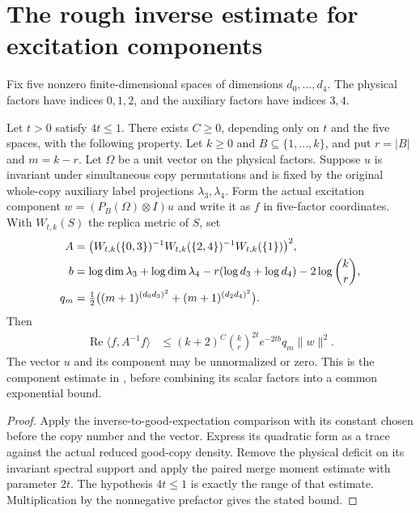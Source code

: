 \section{The rough inverse estimate for excitation components}

Fix five nonzero finite-dimensional spaces of dimensions
$d_0,\ldots,d_4$. The physical factors have indices $0,1,2$, and
the auxiliary factors have indices $3,4$.

\begin{theorem}
  \label{thm:actual_component_inverse_rough}
  \leanok
  Let $t>0$ satisfy $4t\leq1$. There exists $C\geq0$, depending only
  on $t$ and the five spaces, with the following property.
  Let $k\geq0$ and $B\subseteq\{1,\ldots,k\}$, and put $r=|B|$ and
  $m=k-r$. Let $\Omega$ be a unit vector on the physical factors.
  Suppose $u$ is invariant under simultaneous copy permutations and
  is fixed by the original whole-copy auxiliary label projections
  $\lambda_3,\lambda_4$. Form the actual excitation component
  $w=(P_B(\Omega)\otimes I)u$ and write it as $f$ in five-factor
  coordinates. With $W_{t,k}(S)$ the replica metric of $S$, set
  \begin{align}
    A&=\bigl(W_{t,k}(\{0,3\})^{-1}
      W_{t,k}(\{2,4\})^{-1}W_{t,k}(\{1\})\bigr)^2,\notag\\
    b&=\log\dim\lambda_3+\log\dim\lambda_4
      -r(\log d_3+\log d_4)-2\log\binom{k}{r},\notag\\
    q_m&=\tfrac12\bigl((m+1)^{(d_0d_3)^2}
      +(m+1)^{(d_2d_4)^2}\bigr).
  \end{align}
  Then
  \begin{align}
    \operatorname{Re}\langle f,A^{-1}f\rangle
      &\leq (k+2)^C\binom{k}{r}^{2t}e^{-2tb}q_m\|w\|^2.
  \end{align}
  The vector $u$ and its component may be unnormalized or zero.
  This is the component estimate in
  \cite[Section~8]{OpenAI2026AreaLaw}, before combining its scalar
  factors into a common exponential bound.
\end{theorem}
\begin{proof}\leanok
  Apply the inverse-to-good-expectation comparison with its constant
  chosen before the copy number and the vector. Express its quadratic
  form as a trace against the actual reduced good-copy density.
  Remove the physical deficit on its invariant spectral support and
  apply the paired merge moment estimate with parameter $2t$.
  The hypothesis $4t\leq1$ is exactly the range of that estimate.
  Multiplication by the nonnegative prefactor gives the stated bound.
\end{proof}
